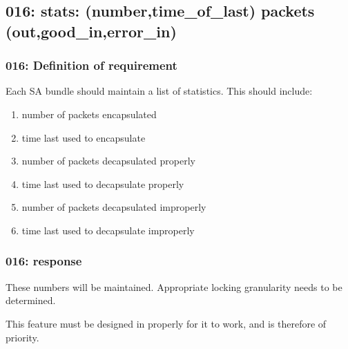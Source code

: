 \subsection{016: stats: (number,time\_of\_last) packets (out,good\_in,error\_in)}

\subsubsection{016: Definition of requirement }

Each SA bundle should maintain a list of statistics. 
This should include:

\begin{enumerate}
\item number of packets encapsulated
\item time last used to encapsulate
\item number of packets decapsulated properly
\item time last used to decapsulate properly
\item number of packets decapsulated improperly
\item time last used to decapsulate improperly
\end{enumerate}

\subsubsection{016: response}

These numbers will be maintained. Appropriate locking granularity needs to be
determined.

This feature must be designed in properly for it to work, and is therefore
of priority.

